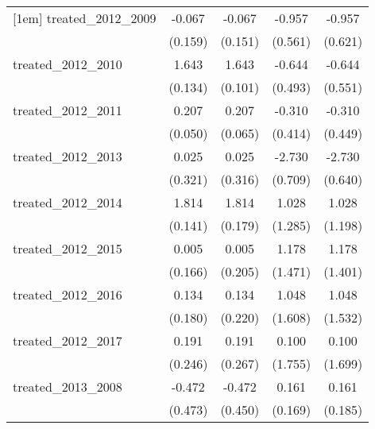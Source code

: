{\begin{tabular}{l*{4}{c}}
[1em]
treated\_2012\_2009&      -0.067         &      -0.067         &      -0.957         &      -0.957         \\
            &     (0.159)         &     (0.151)         &     (0.561)         &     (0.621)         \\
[1em]
treated\_2012\_2010&       1.643\sym{***}&       1.643\sym{***}&      -0.644         &      -0.644         \\
            &     (0.134)         &     (0.101)         &     (0.493)         &     (0.551)         \\
[1em]
treated\_2012\_2011&       0.207\sym{***}&       0.207\sym{**} &      -0.310         &      -0.310         \\
            &     (0.050)         &     (0.065)         &     (0.414)         &     (0.449)         \\
[1em]
treated\_2012\_2013&       0.025         &       0.025         &      -2.730\sym{***}&      -2.730\sym{***}\\
            &     (0.321)         &     (0.316)         &     (0.709)         &     (0.640)         \\
[1em]
treated\_2012\_2014&       1.814\sym{***}&       1.814\sym{***}&       1.028         &       1.028         \\
            &     (0.141)         &     (0.179)         &     (1.285)         &     (1.198)         \\
[1em]
treated\_2012\_2015&       0.005         &       0.005         &       1.178         &       1.178         \\
            &     (0.166)         &     (0.205)         &     (1.471)         &     (1.401)         \\
[1em]
treated\_2012\_2016&       0.134         &       0.134         &       1.048         &       1.048         \\
            &     (0.180)         &     (0.220)         &     (1.608)         &     (1.532)         \\
[1em]
treated\_2012\_2017&       0.191         &       0.191         &       0.100         &       0.100         \\
            &     (0.246)         &     (0.267)         &     (1.755)         &     (1.699)         \\
[1em]
treated\_2013\_2008&      -0.472         &      -0.472         &       0.161         &       0.161         \\
            &     (0.473)         &     (0.450)         &     (0.169)         &     (0.185)         \\

\end{tabular}}
